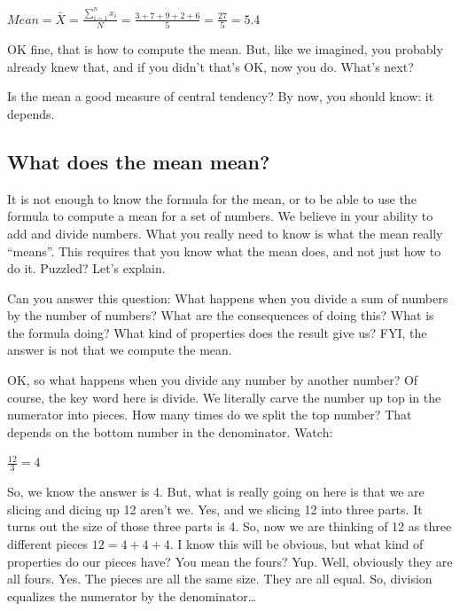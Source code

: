 \documentclass[
]{book}
\begin{document}
\(Mean = \bar{X} = \frac{\sum_{i=1}^{n} x_{i}}{N} = \frac{3+7+9+2+6}{5} = \frac{27}{5} = 5.4\)

OK fine, that is how to compute the mean. But, like we imagined, you probably already knew that, and if you didn't that's OK, now you do. What's next?

Is the mean a good measure of central tendency? By now, you should know: it depends.

\hypertarget{what-does-the-mean-mean}{%
\subsection{What does the mean mean?}\label{what-does-the-mean-mean}}

It is not enough to know the formula for the mean, or to be able to use the formula to compute a mean for a set of numbers. We believe in your ability to add and divide numbers. What you really need to know is what the mean really ``means''. This requires that you know what the mean does, and not just how to do it. Puzzled? Let's explain.

Can you answer this question: What happens when you divide a sum of numbers by the number of numbers? What are the consequences of doing this? What is the formula doing? What kind of properties does the result give us? FYI, the answer is not that we compute the mean.

OK, so what happens when you divide any number by another number? Of course, the key word here is divide. We literally carve the number up top in the numerator into pieces. How many times do we split the top number? That depends on the bottom number in the denominator. Watch:

\(\frac{12}{3} = 4\)

So, we know the answer is 4. But, what is really going on here is that we are slicing and dicing up 12 aren't we. Yes, and we slicing 12 into three parts. It turns out the size of those three parts is 4. So, now we are thinking of 12 as three different pieces \(12 = 4 + 4 + 4\). I know this will be obvious, but what kind of properties do our pieces have? You mean the fours? Yup. Well, obviously they are all fours. Yes. The pieces are all the same size. They are all equal. So, division equalizes the numerator by the denominator\ldots{}
\end{document}
